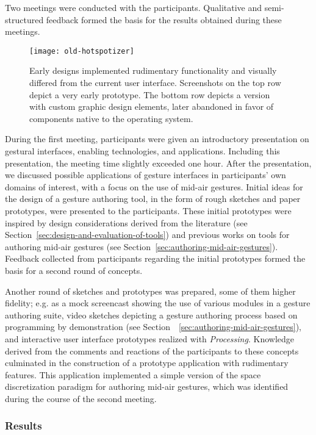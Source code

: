 Two meetings were conducted with the participants. Qualitative and semi-structured feedback formed the basis for the results obtained during these meetings.

\begin{figure}[t]
\centering
\texttt{[image: old-hotspotizer]}
\caption{Early designs implemented rudimentary functionality and visually differed from the current user interface. Screenshots on the top row depict a very early prototype. The bottom row depicts a version with custom graphic design elements, later abandoned in favor of components native to the operating system.}
\label{fig:old-hotspotizer}
\end{figure}

During the first meeting, participants were given an introductory presentation on gestural interfaces, enabling technologies, and applications. Including this presentation, the meeting time slightly exceeded one hour. After the presentation, we discussed possible applications of gesture interfaces in participants' own domains of interest, with a focus on the use of mid-air gestures. Initial ideas for the design of a gesture authoring tool, in the form of rough sketches and paper prototypes, were presented to the participants. These initial prototypes were inspired by design considerations derived from the literature (see Section~\ref{sec:design-and-evaluation-of-tools}) and previous works on tools for authoring mid-air gestures (see Section~\ref{sec:authoring-mid-air-gestures}). Feedback collected from participants regarding the initial prototypes formed the basis for a second round of concepts.

Another round of sketches and prototypes was prepared, some of them higher fidelity; e.g. as a mock screencast showing the use of various modules in a gesture authoring suite, video sketches depicting a gesture authoring process based on programming by demonstration (see Section~~\ref{sec:authoring-mid-air-gestures}), and interactive user interface prototypes realized with \emph{Processing}. Knowledge derived from the comments and reactions of the participants to these concepts culminated in the construction of a prototype application with rudimentary features. This application implemented a simple version of the space discretization paradigm for authoring mid-air gestures, which was identified during the course of the second meeting.

\subsubsection{Results}

